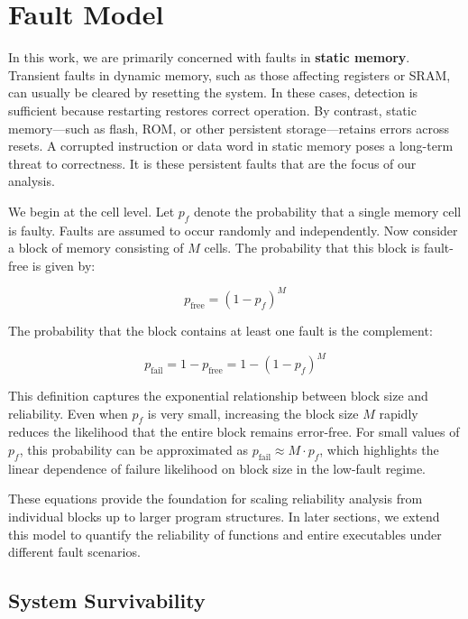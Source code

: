 \chapter{Fault Model}
\label{chap:fault-mod}

In this work, we are primarily concerned with faults in \textbf{static memory}. 
Transient faults in dynamic memory, such as those affecting registers or SRAM, 
can usually be cleared by resetting the system. In these cases, detection is sufficient 
because restarting restores correct operation. By contrast, static memory---such as 
flash, ROM, or other persistent storage---retains errors across resets. 
A corrupted instruction or data word in static memory poses a long-term threat to correctness. 
It is these persistent faults that are the focus of our analysis.  

We begin at the cell level. Let $p_f$ denote the probability that a single memory 
cell is faulty. Faults are assumed to occur randomly and independently. Now consider 
a block of memory consisting of $M$ cells. The probability that this block is 
fault-free is given by:  

\begin{equation}
p_{\mathrm{free}} = (1 - p_f)^M
\end{equation}

The probability that the block contains at least one fault is the complement:  

\begin{equation}
p_{\mathrm{fail}} = 1 - p_{\mathrm{free}} = 1 - (1 - p_f)^M
\end{equation}

This definition captures the exponential relationship between block size and reliability. 
Even when $p_f$ is very small, increasing the block size $M$ rapidly reduces the likelihood 
that the entire block remains error-free. For small values of $p_f$, this probability 
can be approximated as $p_{\mathrm{fail}} \approx M \cdot p_f$, which highlights the 
linear dependence of failure likelihood on block size in the low-fault regime.  

These equations provide the foundation for scaling reliability analysis from 
individual blocks up to larger program structures. In later sections, we extend this 
model to quantify the reliability of functions and entire executables under different 
fault scenarios.  

\section{System Survivability}
\label{sec:system_surv}

